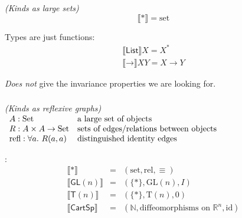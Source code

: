 \documentclass[xetex,serif,mathserif]{beamer}
\newenvironment{slide}[1]{\begin{frame}\frametitle{#1}}{\end{frame}}
\begin{document}
\begin{slide}{}
   \hspace{4cm} \textcolor{black!60}{\emph{(Kinds as large sets)}}
  \begin{displaymath}
    \llbracket * \rrbracket = \mathrm{set}
  \end{displaymath}

  \medskip
  \quad Types are just functions:
  \begin{displaymath}
    \begin{array}{l}
      \llbracket \mathsf{List} \rrbracket X = X^* \\
      \llbracket \mathord\to \rrbracket X Y = X \to Y
    \end{array}
  \end{displaymath}

  \medskip
  \quad\quad \emph{Does not} give the invariance properties we are looking for.
\end{slide}

\begin{slide}{}
   \hspace{3cm} \textcolor{black!60}{\emph{(Kinds as reflexive graphs)}} \\
  \quad $\begin{array}[t]{ll}
    A : \mathrm{Set} & \textrm{a large set of objects} \\
    R : A \times A \to \mathrm{Set} & \textrm{sets of edges/relations between objects} \\
    \mathrm{refl} : \forall a.~R(a,a) & \textrm{distinguished identity edges}
  \end{array}$

  \bigskip

  :
  \begin{displaymath}
    \begin{array}{lcl}
      \llbracket * \rrbracket & = & (\mathrm{set}, \mathrm{rel}, \equiv) \\
      \llbracket \mathsf{GL}(n) \rrbracket & = & (\{*\}, \mathrm{GL}(n), I) \\
      \llbracket \mathsf{T}(n) \rrbracket & = & (\{*\}, \mathrm{T}(n), 0) \\
      \llbracket \mathsf{CartSp} \rrbracket & = & (\mathbb{N}, \textrm{diffeomorphisms on }\mathbb{R}^n, \mathrm{id})
    \end{array}
  \end{displaymath}
\end{slide}
\end{document}
